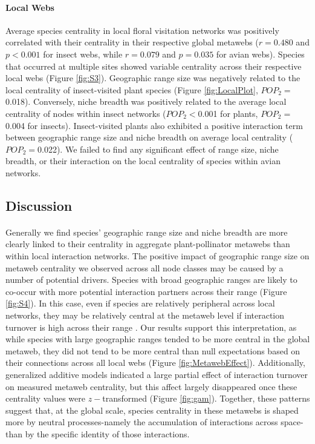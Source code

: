 \documentclass[12pt]{article}
\begin{document}
\paragraph*{Local Webs}
Average species centrality in local floral visitation networks was positively correlated with their centrality in their respective global metawebs ($r=0.480$ and $p<0.001$ for insect webs, while $r=0.079$ and $p=0.035$ for avian webs). Species that occurred at multiple sites showed variable centrality across their respective local webs (Figure \ref{fig:S3}). Geographic range size was negatively related to the local centrality of insect-visited plant species (Figure \ref{fig:LocalPlot}, $POP_2=$0.018). Conversely, niche breadth was positively related to the average local centrality of nodes within insect networks ($POP_2<$0.001 for plants, $POP_2=$0.004 for insects). Insect-visited plants also exhibited a positive interaction term between geographic range size and niche breadth on average local centrality ($POP_2=$0.022). We failed to find any significant effect of range size, niche breadth, or their interaction on the local centrality of species within avian networks.







\subsection*{Discussion}
\paragraph*{} Generally we find species' geographic range size and niche breadth are more clearly linked to their centrality in aggregate plant-pollinator metawebs than within local interaction networks. The positive impact of geographic range size on metaweb centrality we observed across all node classes may be caused by a number of potential drivers. Species with broad geographic ranges are likely to co-occur with more potential interaction partners across their range (Figure \ref{fig:S4}). In this case, even if species are relatively peripheral across local networks, they may be relatively central at the metaweb level if interaction turnover is high across their range \citep{martins2025determinants}. Our results support this interpretation, as while species with large geographic ranges tended to be more central in the global metaweb, they did not tend to be more central than null expectations based on their connections across all local webs (Figure \ref{fig:MetawebEffect}). Additionally, generalized additive models indicated a large partial effect of interaction turnover on measured metaweb centrality, but this affect largely disappeared once these centrality values were $z-$transformed (Figure \ref{fig:gam}). Together, these patterns suggest that, at the global scale, species centrality in these metawebs is shaped more by neutral processes-namely the accumulation of interactions across space-than by the specific identity of those interactions. 
\end{document}
